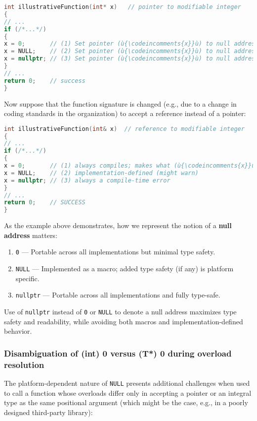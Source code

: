 \begin{lstlisting}[language=C++]
int illustrativeFunction(int* x)   // pointer to modifiable integer
{
// ...
if (/*...*/)
{
x = 0;       // (1) Set pointer (ù{\codeincomments{x}}ù) to null address.
x = NULL;    // (2) Set pointer (ù{\codeincomments{x}}ù) to null address.
x = nullptr; // (3) Set pointer (ù{\codeincomments{x}}ù) to null address.
}
// ...
return 0;    // success
}
\end{lstlisting}


Now suppose that the function signature is changed (e.g., due to a
change in coding standards in the organization) to accept a reference
instead of a pointer:

\begin{lstlisting}[language=C++]
int illustrativeFunction(int& x)  // reference to modifiable integer
{
// ...
if (/*...*/)
{
x = 0;       // (1) always compiles; makes what (ù{\codeincomments{x}}ù) refers to 0
x = NULL;    // (2) implementation-defined (might warn)
x = nullptr; // (3) always a compile-time error
}
// ...
return 0;    // SUCCESS
}
\end{lstlisting}


As the example above demonstrates, how we represent the notion of a
\textbf{null address} matters:
\begin{enumerate}
\item{\texttt{0} — Portable across all implementations but minimal type safety.}
\item{\texttt{NULL} — Implemented as a macro; added type safety (if any) is platform specific.}
\item{\texttt{nullptr} — Portable across all implementations and fully type-safe.}
\end{enumerate}
Use of \texttt{nullptr} instead of \texttt{0} or \texttt{NULL} to denote
a null address maximizes type safety and readability, while avoiding
both macros and implementation-defined behavior.

\subsubsection[Disambiguation of \tt{(int) 0} versus \tt{(T*) 0} during overload resolution]{Disambiguation of {\ParaCode (int) 0} versus {\ParaCode (T*) 0} during overload resolution}\label{disambiguation-of-(int)-0-versus-(t*)-0-during-overload-resolution}

The platform-dependent nature of \texttt{NULL} presents additional
challenges when used to call a function whose overloads differ only in
accepting a pointer or an integral type as the same positional argument
(which might be the case, e.g., in a poorly designed third-party
library):

